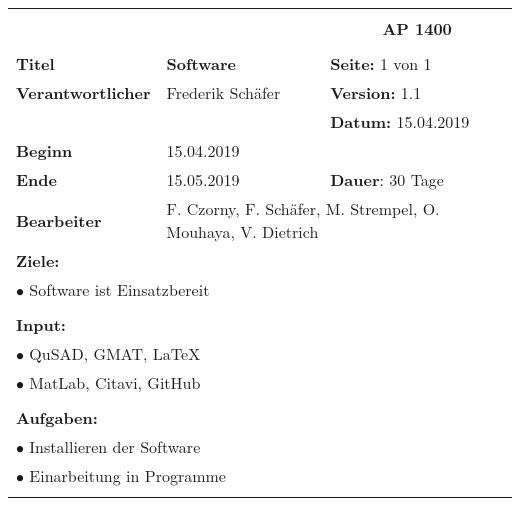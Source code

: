 \clearpage
\begin{table}[!h]
 \begin{center}
  \begin{tabular}{|p{35mm}||p{55mm}|p{50mm}||p{40mm}|}
   \hline
   \multicolumn{3}{|l||}{\textbf{}} & \multicolumn{1}{c|}{}\\
   \multicolumn{3}{|l||}{\textbf{}} & \multicolumn{1}{c|}{\textbf{AP 1400}}\\
   \multicolumn{3}{|l||}{\textbf{}} & \multicolumn{1}{c|}{}\\
   \hline\hline
   \textbf{Titel} & \multicolumn{2}{p{7cm}||}{\textbf{Software}} & \textbf{Seite:} 1 von 1\\
   \hline
   \textbf{Verantwortlicher} & \multicolumn{2}{l||}{Frederik Schäfer} & \textbf{Version:} 1.1\\
   \hline
   \multicolumn{3}{|l||}{} & \textbf{Datum:} 15.04.2019\\
   \hline\hline
   \textbf{Beginn} & \multicolumn{2}{l||}{15.04.2019} & \\
   \hline
   \textbf{Ende} & \multicolumn{2}{l||}{15.05.2019} & \textbf{Dauer}: 30 Tage\\
   \hline\hline
   \textbf{Bearbeiter} & \multicolumn{3}{l|}{F. Czorny, F. Schäfer, M. Strempel, O. Mouhaya, V. Dietrich}\\
   \hline\hline
   \multicolumn{4}{|p{150mm}|}{\textbf{Ziele:}}\\
   \multicolumn{4}{|p{150mm}|}{$\bullet$ Software ist Einsatzbereit}\\
   \multicolumn{4}{|p{150mm}|}{}\\
   \multicolumn{4}{|p{150mm}|}{\textbf{Input:}}\\
   \multicolumn{4}{|p{150mm}|}{$\bullet$ QuSAD, GMAT, LaTeX}\\
   \multicolumn{4}{|p{150mm}|}{$\bullet$ MatLab, Citavi, GitHub}\\
   \multicolumn{4}{|p{150mm}|}{}\\
   \multicolumn{4}{|p{150mm}|}{\textbf{Aufgaben:}}\\
   \multicolumn{4}{|p{150mm}|}{$\bullet$ Installieren der Software}\\
   \multicolumn{4}{|p{150mm}|}{$\bullet$ Einarbeitung in Programme}\\
   \multicolumn{4}{|p{150mm}|}{}\\
   \hline
  \end{tabular}
 \end{center}
\end{table}


